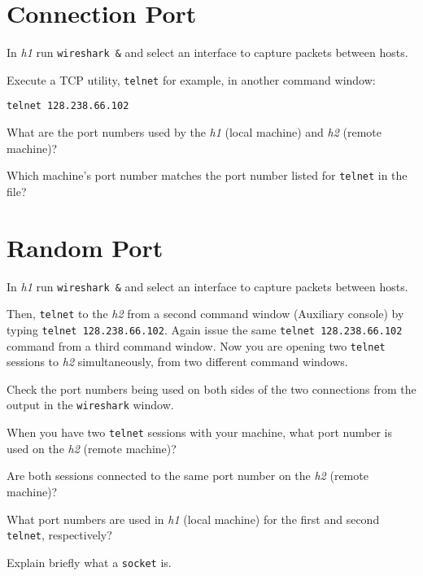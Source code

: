 \documentclass{../UTNetLab}
\begin{document}
\section{Connection Port}
    In \textit{h1} run \lstinline{wireshark &} and select an interface to capture packets between hosts.

    Execute a TCP utility, \lstinline{telnet} for example, in another command window:
    \begin{lstlisting}
telnet 128.238.66.102
    \end{lstlisting}
    
    \begin{report}
        \item What are the port numbers used by the \textit{h1} (local machine) and \textit{h2} (remote machine)?

        \item Which machine’s port number matches the port number listed for \lstinline{telnet} in the  file?
    \end{report}

\section{Random Port}
    In \textit{h1} run \lstinline{wireshark &} and select an interface to capture packets between hosts.

    Then, \lstinline{telnet} to the \textit{h2} from a second command window (Auxiliary console) by typing \lstinline{telnet 128.238.66.102}.
    Again issue the same \lstinline{telnet 128.238.66.102} command from a third command window.
    Now you are opening two \lstinline{telnet} sessions to \textit{h2} simultaneously, from two different command windows.

    Check the port numbers being used on both sides of the two connections from the output in the \lstinline{wireshark} window.

    \begin{report}
        \item When you have two \lstinline{telnet} sessions with your machine, what port number is used on the \textit{h2} (remote machine)?

        \item Are both sessions connected to the same port number on the \textit{h2} (remote machine)?

        \item What port numbers are used in \textit{h1} (local machine) for the first and second \lstinline{telnet}, respectively?

        \item Explain briefly what a \lstinline[language=bash]{socket} is.
    \end{report}
\end{document}
